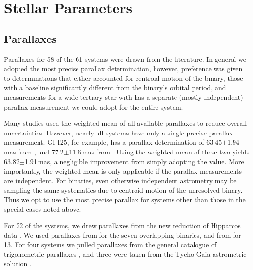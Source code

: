\documentclass[twocolumn]{aastex62}
\begin{document}
\section{Stellar Parameters}\label{sec:params}

\subsection{Parallaxes}\label{sec:plx}

Parallaxes for 58 of the 61 systems were drawn from the literature. In general we adopted the most precise parallax determination, however, preference was given to determinations that either accounted for centroid motion of the binary, those with a baseline significantly different from the binary's orbital period, and measurements for a wide tertiary star with has a separate (mostly independent) parallax measurement we could adopt for the entire system. 

Many studies used the weighted mean of all available parallaxes \citep[e.g.,][]{Winters2015} to reduce overall uncertainties. However, nearly all systems have only a single precise parallax measurement. Gl 125, for example, has a parallax determination of 63.45$\pm$1.94\,mas from \citet{van-Leeuwen:2007yq}, and 77.2$\pm$11.6\,mas from \citet{van-Altena1995}. Using the weighted mean of these two yields 63.82$\pm$1.91\,mas, a negligible improvement from simply adopting the \citet{van-Leeuwen:2007yq} value. More importantly, the weighted mean is only applicable if the parallax measurements are independent. For binaries, even otherwise independent astrometry may be sampling the same systematics due to centroid motion of the unresolved binary. Thus we opt to use the most precise parallax for systems other than those in the special cases noted above.  

For 22 of the systems, we drew parallaxes from the new reduction of Hipparcos data \citep{van-Leeuwen:2007yq}. We used parallaxes from \citet{Dupuy2017} for the seven overlapping binaries, and from \citet{Benedict2016} for 13. For four systems we pulled parallaxes from the general catalogue of trigonometric parallaxes \citep{van-Altena1995}, and three were taken from the Tycho-Gaia astrometric solution \citep[TGAS or Gaia DR1,][]{gaiadr1}.
\end{document}
